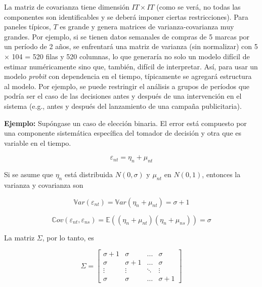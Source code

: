 \documentclass[
]{book}
\begin{document}
La matriz de covarianza \Sigma tiene dimensión \(IT \times IT\) (como se verá, no todas las componentes son identificables y se deberá imponer ciertas restricciones). Para paneles típicos, \(T\) es grande y genera matrices de varianza-covarianza muy grandes. Por ejemplo, si se tienen datos semanales de compras de 5 marcas por un período de 2 años, se enfrentará una matriz de varianza (sin normalizar) con 5 × 104 = 520 filas y 520 columnas, lo que generaría no solo un modelo difícil de estimar numéricamente sino que, también, difícil de interpretar. Así, para usar un modelo \emph{probit} con dependencia en el tiempo, típicamente se agregará estructura al modelo. Por ejemplo, se puede restringir el análisis a grupos de períodos que podría ser el caso de las decisiones antes y después de una intervención en el sistema (e.g., antes y después del lanzamiento de una campaña publicitaria).

\textbf{Ejemplo:} Supóngase un caso de elección binaria. El error está compuesto por una componente sistemática específica del tomador de decisión y otra que es variable en el tiempo.

\begin{equation} 
  \varepsilon_{nt} = \eta_n + \mu_{nt}
  \label{eq:errorbinario}
\end{equation}

Si se asume que \(η_n\) está distribuida \(N(0, σ)\) y \(\mu_{nt}\) en \(N(0, 1)\), entonces la varianza y covarianza son

\begin{equation} 
  \mathbb{V}ar(\varepsilon_{nt}) =  \mathbb{V}ar(\eta_{n}+ \mu_{nt}) = \sigma + 1
    \label{eq:varbinaria}
  \end{equation}

\begin{equation} 
  \mathbb{C}ov(\varepsilon_{nt},\varepsilon_{ns}) =  \mathbb{E}((\eta_{n}+ \mu_{nt}) (\eta_{n}+ \mu_{ns})) = \sigma
    \label{eq:covbinaria}
  \end{equation}

La matriz \(\Sigma\), por lo tanto, es

\begin{equation} 
  Σ = \begin{bmatrix}\sigma +1 & \sigma & ... & \sigma\\
\sigma & \sigma+1 & ... & \sigma\\
\vdots & \vdots & \ddots & \vdots\\
\sigma & \sigma & \dots & \sigma +1
\end{bmatrix}
    \label{eq:matrizsum}
  \end{equation}
\end{document}
